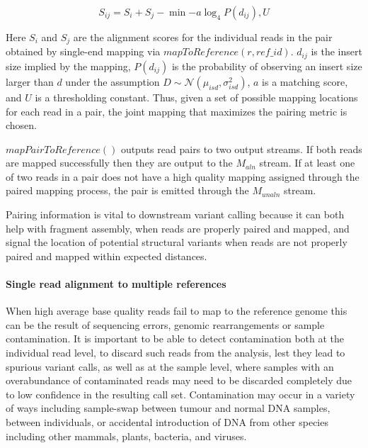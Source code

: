 \begin{equation}
    S_{ij}=S_i + S_j - \min{-a\log_4P(d_{ij}),U}
\end{equation}

Here $S_i$ and $S_j$ are the alignment scores for the individual reads in the pair obtained by single-end mapping via $mapToReference(r, ref\_id)$. $d_{ij}$ is the insert size implied by the mapping, $P(d_{ij})$ is the probability of observing an insert size larger than $d$ under the assumption $D \sim \mathcal{N}(\mu_{isd}, \sigma_{isd}^2)$, $a$ is a matching score, and $U$ is a thresholding constant. Thus, given a set of possible mapping locations for each read in a pair, the joint mapping that maximizes the pairing metric is chosen.

$mapPairToReference()$ outputs read pairs to two output streams. If both reads are mapped successfully then they are output to the $M_{aln}$ stream. If at least one of two reads in a pair does not have a high quality mapping assigned through the paired mapping process, the pair is emitted through the $M_{unaln}$ stream.

Pairing information is vital to downstream variant calling because it can both help with fragment assembly, when reads are properly paired and mapped, and signal the location of potential structural variants when reads are not properly paired and mapped within expected distances.

\paragraph{Single read alignment to multiple references}
When high average base quality reads fail to map to the reference genome this can be the result of sequencing errors, genomic rearrangements or sample contamination. It is important to be able to detect contamination both at the individual read level, to discard such reads from the analysis, lest they lead to spurious variant calls, as well as at the sample level, where samples with an overabundance of contaminated reads may need to be discarded completely due to low confidence in the resulting call set. Contamination may occur in a variety of ways including sample-swap between tumour and normal DNA samples, between individuals, or accidental introduction of DNA from other species including other mammals, plants, bacteria, and viruses. 


